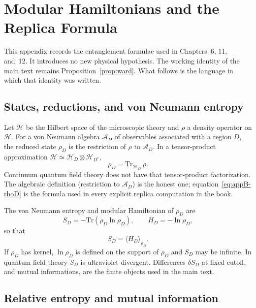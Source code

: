 \chapter{Modular Hamiltonians and the Replica Formula}
\label{app:modular}

This appendix records the entanglement formulae used in
Chapters~6, 11, and~12. It introduces no new physical hypothesis.
The working identity of the main text remains
Proposition~\ref{prop:ward}. What follows is the language in which
that identity was written.

\section{States, reductions, and von Neumann entropy}
\label{sec:appB-vN}

Let \(\mathcal{H}\) be the Hilbert space of the microscopic theory
and \(\rho\) a density operator on \(\mathcal{H}\). For a von
Neumann algebra \(\mathcal{A}_D\) of observables associated with a
region \(D\), the reduced state \(\rho_D\) is the restriction of
\(\rho\) to \(\mathcal{A}_D\). In a tensor-product approximation
\(\mathcal{H}\simeq\mathcal{H}_D\otimes\mathcal{H}_{D^c}\),
\begin{equation}
  \label{eq:appB-rhoD}
  \rho_D=\mathrm{Tr}_{\mathcal{H}_{D^c}}\rho.
\end{equation}
Continuum quantum field theory does not have that tensor-product
factorization. The algebraic definition (restriction to
\(\mathcal{A}_D\)) is the honest one; equation~\eqref{eq:appB-rhoD}
is the formula used in every explicit replica computation in the
book.

The von Neumann entropy and modular Hamiltonian of \(\rho_D\) are
\begin{equation}
  \label{eq:appB-SH}
  S_D=-\mathrm{Tr}(\rho_D\ln\rho_D),
  \qquad
  H_D=-\ln\rho_D,
\end{equation}
so that
\begin{equation}
  \label{eq:appB-S-eq-H}
  S_D=\langle H_D\rangle_{\rho_D}.
\end{equation}
If \(\rho_D\) has kernel, \(\ln\rho_D\) is defined on the support
of \(\rho_D\) and \(S_D\) may be infinite. In quantum field theory
\(S_D\) is ultraviolet divergent. Differences \(\delta S_D\) at
fixed cutoff, and mutual informations, are the finite objects used
in the main text.

\section{Relative entropy and mutual information}
\label{sec:appB-rel}


